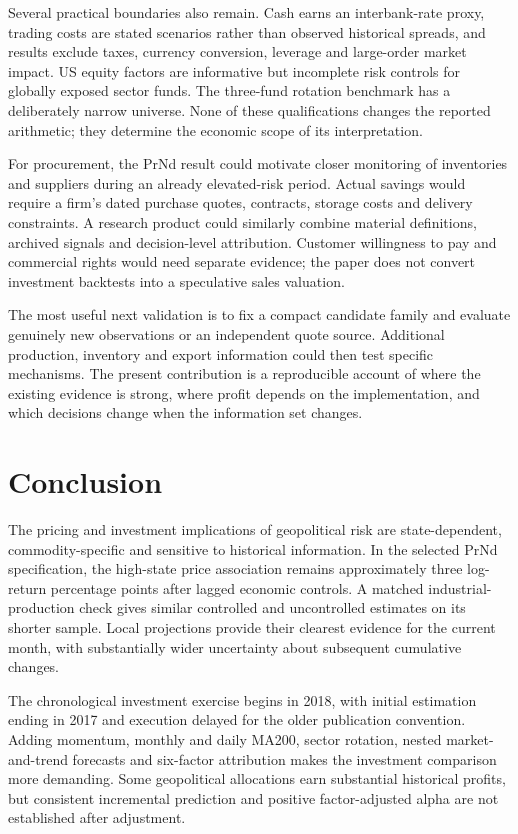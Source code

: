 Several practical boundaries also remain. Cash earns an interbank-rate proxy, trading costs are stated scenarios rather than observed historical spreads, and results exclude taxes, currency conversion, leverage and large-order market impact. US equity factors are informative but incomplete risk controls for globally exposed sector funds. The three-fund rotation benchmark has a deliberately narrow universe. None of these qualifications changes the reported arithmetic; they determine the economic scope of its interpretation.

For procurement, the PrNd result could motivate closer monitoring of inventories and suppliers during an already elevated-risk period. Actual savings would require a firm's dated purchase quotes, contracts, storage costs and delivery constraints. A research product could similarly combine material definitions, archived signals and decision-level attribution. Customer willingness to pay and commercial rights would need separate evidence; the paper does not convert investment backtests into a speculative sales valuation.

The most useful next validation is to fix a compact candidate family and evaluate genuinely new observations or an independent quote source. Additional production, inventory and export information could then test specific mechanisms. The present contribution is a reproducible account of where the existing evidence is strong, where profit depends on the implementation, and which decisions change when the information set changes.

\section{Conclusion}

The pricing and investment implications of geopolitical risk are state-dependent, commodity-specific and sensitive to historical information. In the selected PrNd specification, the high-state price association remains approximately three log-return percentage points after lagged economic controls. A matched industrial-production check gives similar controlled and uncontrolled estimates on its shorter sample. Local projections provide their clearest evidence for the current month, with substantially wider uncertainty about subsequent cumulative changes.

The chronological investment exercise begins in 2018, with initial estimation ending in 2017 and execution delayed for the older publication convention. Adding momentum, monthly and daily MA200, sector rotation, nested market-and-trend forecasts and six-factor attribution makes the investment comparison more demanding. Some geopolitical allocations earn substantial historical profits, but consistent incremental prediction and positive factor-adjusted alpha are not established after adjustment.

